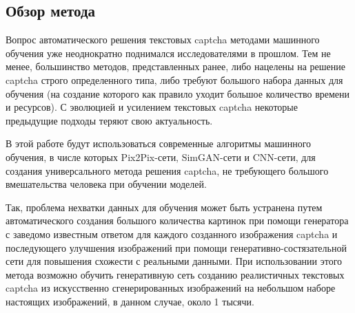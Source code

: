 \subsection{Обзор метода}
Вопрос автоматического решения текстовых captcha методами машинного обучения уже неоднократно поднимался исследователями в прошлом\cite{prev-research-2, prev-research-3, prev-research-4}. Тем не менее, большинство методов, представленных ранее, либо нацелены на решение captcha строго определенного типа, либо требуют большого набора данных для обучения (на создание которого как правило уходит большое количество времени и ресурсов). С эволюцией и усилением текстовых captcha некоторые предыдущие подходы теряют свою актуальность\cite{prev-research-1}.

В этой работе будут использоваться современные алгоритмы машинного обучения, в числе которых Pix2Pix-сети, SimGAN-сети и CNN-сети, для создания универсального метода решения captcha, не требующего большого вмешательства человека при обучении моделей.

Так, проблема нехватки данных для обучения может быть устранена путем автоматического создания большого количества картинок при помощи генератора с заведомо известным ответом для каждого созданного изображения captcha и последующего улучшения изображений при помощи генеративно-состязательной сети для повышения схожести с реальными данными. При использовании этого метода возможно обучить генеративную сеть созданию реалистичных текстовых captcha из искусственно сгенерированных изображений на небольшом наборе настоящих изображений, в данном случае, около 1 тысячи.

